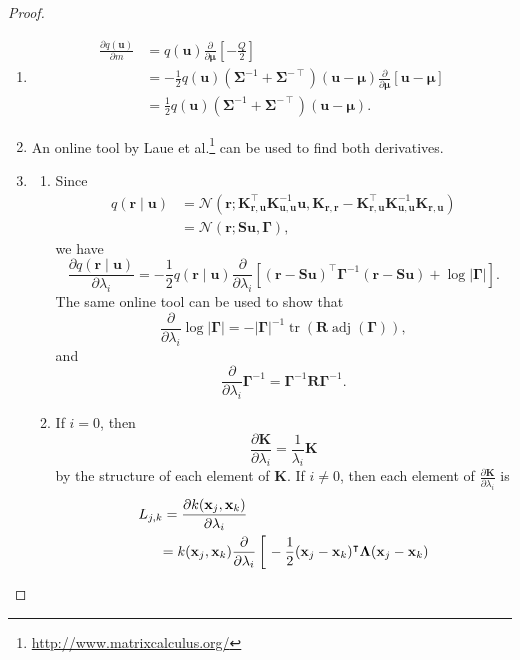 \documentclass{mpaper}
\DeclareMathOperator{\adj}{adj}
\DeclareMathOperator{\tr}{tr}
\newcommand{\Kuu}{\mathbf{K}_{\mathbf{u},\mathbf{u}}}
\newcommand{\Krr}{\mathbf{K}_{\mathbf{r},\mathbf{r}}}
\newcommand{\Kru}{\mathbf{K}_{\mathbf{r},\mathbf{u}}}
\newcommand{\dm}{\frac{\partial}{\partial\bm\mu}}
\newcommand{\dl}{\frac{\partial}{\partial \lambda_i}}
\begin{document}
\derivatives*
\begin{proof}
  \leavevmode
  \begin{enumerate}
  \item
    \[
      \begin{split}
        \frac{\partial q(\mathbf{u})}{\partial m} &=
        q(\mathbf{u})\dm\left[-\frac{Q}{2}\right]
        \\
        &= -\frac{1}{2}q(\mathbf{u})(\bm\Sigma^{-1} +
        \bm\Sigma^{-\intercal})(\mathbf{u} - \bm\mu)\dm[\mathbf{u} -
        \bm\mu] \\
        &= \frac{1}{2}q(\mathbf{u})(\bm\Sigma^{-1} +
        \bm\Sigma^{-\intercal})(\mathbf{u} - \bm\mu).
      \end{split}
    \]
  \item An online tool by Laue et
    al.\footnote{\url{http://www.matrixcalculus.org/}}
    \cite{DBLP:conf/nips/LaueMG18} can be used to find both derivatives.
  \item
    \begin{enumerate}
    \item Since
    \begin{align*}
      q(\mathbf{r} \mid \mathbf{u}) &= \mathcal{N}(\mathbf{r};
      \Kru^\intercal\Kuu^{-1}\mathbf{u}, \Krr - \Kru^\intercal \Kuu^{-1}\Kru) \\
      &= \mathcal{N}(\mathbf{r}; \mathbf{Su}, \bm\Gamma),
    \end{align*}
    we have
    \[
      \frac{\partial q(\mathbf{r} \mid \mathbf{u})}{\partial \lambda_i} =
      -\frac{1}{2}q(\mathbf{r} \mid \mathbf{u}) \dl[(\mathbf{r} -
      \mathbf{Su})^\intercal\bm\Gamma^{-1}(\mathbf{r} - \mathbf{Su}) +
      \log|\bm\Gamma|].
    \]
    The same online tool can be used to show that
    \[
      \dl \log|\bm\Gamma| = -|\bm\Gamma|^{-1}\tr(\mathbf{R}\adj(\bm\Gamma)),
    \]
    and
    \[
      \dl \bm\Gamma^{-1} = \bm\Gamma^{-1}\mathbf{R}\bm\Gamma^{-1}.
    \]
  \item
    If $i=0$, then
    \[
      \frac{\partial \mathbf{K}}{\partial \lambda_i} =
      \frac{1}{\lambda_i}\mathbf{K}
    \]
    by the structure of each element of $\mathbf{K}$. If $i \ne 0$, then each
    element of $\frac{\partial \mathbf{K}}{\partial \lambda_i}$ is
    \begin{align*}
      L_{j,k} &= \frac{\partial k(\mathbf{x}_j, \mathbf{x}_k)}{\partial \lambda_i} \\
      &\begin{aligned}
        = k(\mathbf{x}_j, \mathbf{x}_k) \dl \left[ \vphantom{\frac{1}{2}} \right. &-\frac{1}{2}(\mathbf{x}_j - \mathbf{x}_k)^\intercal \bm\Lambda (\mathbf{x}_j - \mathbf{x}_k) \\

\end{aligned}
\end{align*}
\end{enumerate}
\end{enumerate}
\end{proof}
\end{document}
